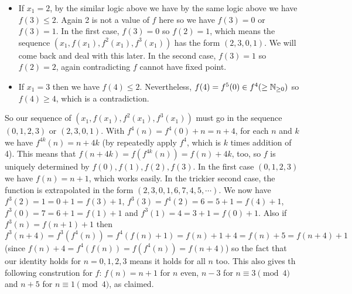 \documentclass[11pt,a4paper]{article}
\begin{document}
\begin{enumerate}
\begin{itemize}
    	\item If $x_1=2$, by the similar logic above we have by the same logic above we have $f(3)\le 2$. Again 2 is not a value of $f$ here so we have $f(3)=0$ or $f(3)=1$. 
    	In the first case, $f(3)=0$ so $f(2)=1$, which means the sequence $(x_1, f(x_1), f^2(x_1), f^3(x_1))$ has the form $(2, 3, 0, 1)$. We will come back and deal with this later. 
    	In the second case, $f(3)=1$ so $f(2)=2$, again contradicting $f$ cannot have fixed point. 
    	
    	\item If $x_1=3$ then we have $f(4)\le 2$. Nevertheless, $f(4)=f^5(0)\in f^4(\ge\mathbb{N}_{\ge 0})$ so $f(4)\ge 4$, which is a contradiction. 
    \end{itemize}
\end{enumerate}
	So our sequence of $(x_1, f(x_1), f^2(x_1), f^3(x_1))$ must go in the sequence $(0, 1, 2, 3)$ or $(2, 3, 0, 1)$. 
	With $f^4(n)=f^4(0)+n=n+4$, for each $n$ and $k$ we have $f^{4k}(n)=n+4k$ (by repeatedly apply $f^4$, which is $k$ times addition of 4). 
	This means that $f(n+4k)=f(f^{4k}(n))=f(n)+4k$, too, so $f$ is uniquely determined by $f(0), f(1), f(2), f(3)$. 
	In the first case $(0, 1, 2, 3)$ we have $f(n)=n+1$, which works easily. 
	In the trickier second case, the function is extrapolated in the form $(2, 3, 0, 1, 6, 7, 4, 5, \cdots)$. We now have  $f^3(2)=1=0+1=f(3)+1$, $f^3(3)=f^4(2)=6=5+1=f(4)+1$, $f^3(0)=7=6+1=f(1)+1$ and $f^3(1)=4=3+1=f(0)+1$. Also if $f^3(n)=f(n+1)+1$ then $f^3(n+4)=f^3(f^4(n))=f^4(f(n)+1)=f(n)+1+4=f(n)+5=f(n+4)+1$ (since $f(n)+4=f^4(f(n))=f(f^4(n))=f(n+4)$) so the fact that our identity holds for $n=0, 1, 2, 3$ means it holds for all $n$ too. This also gives th following constrution for $f$: 
	$f(n)=n+1$ for $n$ even, $n-3$ for $n\equiv 3\pmod{4}$ and $n+5$ for $n\equiv 1\pmod{4}$, as claimed. 
	
\end{document}
